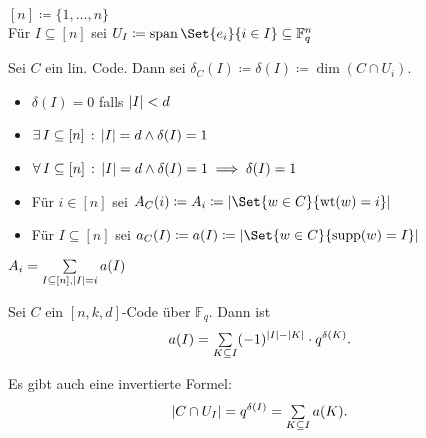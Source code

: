 \documentclass{cheat-sheet}
\newcommand{\F}{\mathbb{F}} %
\DeclareMathOperator{\wt}{wt} %
\DeclareMathOperator{\spann}{span} %
\begin{document}


\begin{nota}
  $[n] \coloneqq \{ 1, \ldots, n \}$ \\
  Für $I \subseteq [n]$ sei $U_I \coloneqq \spann \Set{e_i}{i \in I} \subseteq \F_q^n$
\end{nota}


\begin{defn}
  Sei $C$ ein lin. Code.
  Dann sei $\delta_C(I) \coloneqq \delta(I) \coloneqq \dim(C \cap U_i)$.
\end{defn}

\begin{prop}
  \begin{itemize}
    \item $\delta(I) = 0$ falls $\lvert I\rvert < d$
    \item $\exists \, {I \subseteq [n]} \,:\, \lvert I\rvert = d \wedge \delta(I) = 1$
    \item $\forall \, {I \subseteq [n]} \,:\, \lvert I\rvert = d \wedge \delta(I) = 1 \implies \delta(I) = 1$
  \end{itemize}
\end{prop}

\begin{defn}
  \begin{minipage}[t]{0.88 \linewidth}
    \begin{itemize}
      \item Für $i \in [n]$ sei $A_C(i) \coloneqq A_i \coloneqq \abs{\Set{w \in C}{\wt(w) = i}}$
      \item Für $I \subseteq [n]$ sei $a_C(I) \coloneqq a(I) \coloneqq \abs{\Set{w \in C}{\supp(w) = I}}$
    \end{itemize}
  \end{minipage}
\end{defn}

\begin{bem}
  $A_i = \sum_{I \subseteq [n], \abs{I} = i} a(I)$
\end{bem}

\begin{satz}
  Sei $C$ ein $[n, k, d]$-Code über $\F_q$.
  Dann ist
  \[
    a(I) = \sum_{K \subseteq I} (-1)^{\abs{I} - \abs{K}} \cdot q^{\delta(K)}.
  \]
\end{satz}

\begin{bem}
  Es gibt auch eine invertierte Formel:
  \[
    \abs{C \cap U_I} = q^{\delta(I)} = \sum_{K \subseteq I} a(K).
  \]
\end{bem}
\end{document}
